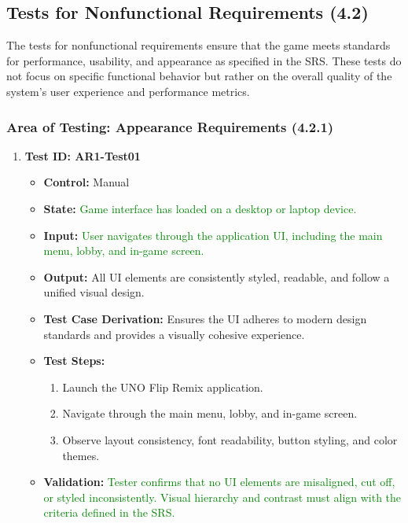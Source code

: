 \documentclass[12pt]{article}
\newcommand{\added}[1]{\textcolor{green}{#1}}
\begin{document}
\subsection{Tests for Nonfunctional Requirements (4.2)}

The tests for nonfunctional requirements ensure that the game meets standards for performance, usability, and appearance as specified in the SRS. These tests do not focus on specific functional behavior but rather on the overall quality of the system’s user experience and performance metrics.

\subsubsection{Area of Testing: Appearance Requirements (4.2.1)}

\begin{enumerate}
    \item \textbf{Test ID: AR1-Test01}
    \begin{itemize}
        \item \textbf{Control:} Manual
        \item \textbf{State:} \added{Game interface has loaded on a desktop or laptop device.}
        \item \textbf{Input:} \added{User navigates through the application UI, including the main menu, lobby, and in-game screen.}
        \item \textbf{Output:} All UI elements are consistently styled, readable, and follow a unified visual design.
        \item \textbf{Test Case Derivation:} Ensures the UI adheres to modern design standards and provides a visually cohesive experience.
        \item \textbf{Test Steps:}
        \begin{enumerate}
            \item Launch the UNO Flip Remix application.
            \item Navigate through the main menu, lobby, and in-game screen.
            \item Observe layout consistency, font readability, button styling, and color themes.
        \end{enumerate}
        \item \textbf{Validation:} \added{Tester confirms that no UI elements are misaligned, cut off, or styled inconsistently. Visual hierarchy and contrast must align with the criteria defined in the SRS.}
    \end{itemize}
\end{enumerate}
\end{document}
